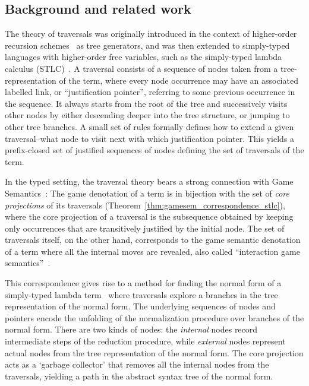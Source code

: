 \documentclass{elsarticle}
\theoremstyle{plain}
\theoremstyle{definition}
\theoremstyle{remark}
\begin{document}
\subsection{Background and related work}

The theory of traversals was originally introduced in the context of higher-order recursion schemes~\cite{OngLics2006} as tree generators, and was
then extended to simply-typed languages with higher-order free variables, such as the simply-typed lambda calculus (STLC)~\cite{BlumPhd}. A traversal consists of a sequence of nodes taken from a tree-representation of the term, where every node occurrence may have an associated labelled link, or ``justification pointer'', referring to some previous occurrence in the sequence. It always starts from the root of the tree and successively visits other nodes by either descending deeper into the tree structure, or jumping to other tree branches. A small set of rules formally defines how to extend a given traversal--what node to visit next with which justification pointer. This yields a prefix-closed set of justified sequences of nodes defining the set of traversals of the term.

In the typed setting, the traversal theory bears a strong connection with Game Semantics~\cite{BlumPhd}: The game denotation of a term is in bijection with the set of \emph{core projections} of its traversals (Theorem~\ref{thm:gamesem_correspondence_stlc}), where the core projection of a traversal is the subsequence obtained by keeping only occurrences that are
transitively justified by the initial node.
The set of traversals itself, on the other hand, corresponds to the game semantic denotation of a term where all the internal moves are revealed, also called ``interaction game semantics''~\cite{BlumPhd}.

This correspondence gives rise to a method for finding the normal form of a simply-typed lambda term~\cite{BlumPhd,BlumGalop2008,Blum-LocalBeta2008}
where traversals explore a branches in the tree representation of the normal form. The underlying sequences of nodes and pointers encode the unfolding of the normalization procedure over branches of the normal form. There are two kinds of nodes: the \emph{internal} nodes record intermediate steps of the reduction procedure, while \emph{external} nodes represent actual nodes from the tree representation of the normal form. The core projection acts as a `garbage collector' that removes all the internal nodes from the traversals,  yielding a path in the abstract syntax tree of the normal form.
\end{document}

